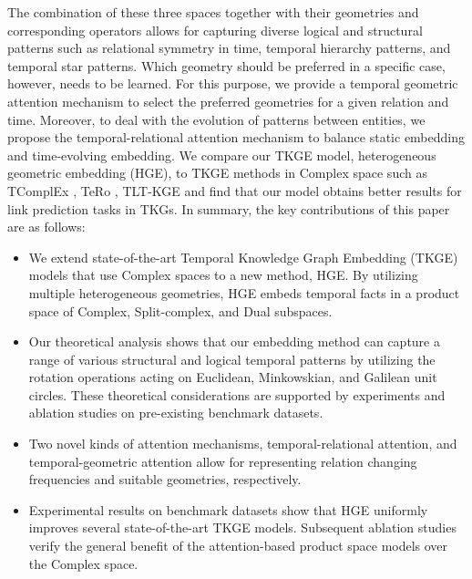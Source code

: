 \documentclass[letterpaper]{article} %
\begin{document}
The combination of these three spaces together with their geometries and corresponding operators allows for capturing diverse logical and structural patterns such as relational symmetry in time, temporal hierarchy patterns, and temporal star patterns. 
Which geometry should be preferred in a specific case, however, needs to be learned.
For this purpose, we provide a temporal geometric attention mechanism to select the preferred geometries for a given relation and time. 
Moreover, to deal with the evolution of patterns between entities, we propose the temporal-relational attention mechanism to balance static embedding and time-evolving embedding. 
We compare our TKGE model, heterogeneous geometric embedding (HGE), to TKGE methods in Complex space such as TComplEx \cite{tcomplexlacroix2020tensor}, TeRo \cite{xu2020tero}, TLT-KGE \cite{tltcomplexzhang2022along} and find that our model obtains better results for link prediction tasks in TKGs.
In summary, the key contributions of this paper are as follows:
\begin{itemize}
    \item We extend state-of-the-art Temporal Knowledge Graph Embedding (TKGE) models that use Complex spaces to a new method, HGE. By utilizing multiple heterogeneous geometries, HGE embeds temporal facts in a product space of Complex, Split-complex, and Dual subspaces. 
    \item Our theoretical analysis shows that our embedding method can capture a range of various structural and logical temporal patterns by utilizing the rotation operations acting on  Euclidean, Minkowskian, and Galilean unit circles.
    These theoretical considerations are supported by experiments and ablation studies on pre-existing benchmark datasets.
    \item Two novel kinds of attention mechanisms, temporal-relational attention, and temporal-geometric attention allow for representing relation changing frequencies and suitable geometries, respectively.
    \item Experimental results on benchmark datasets show that HGE uniformly improves several state-of-the-art TKGE models. Subsequent ablation studies verify the general benefit of the attention-based product space models over the Complex space.
\end{itemize} 
\end{document}
